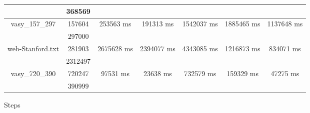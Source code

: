 \documentclass[../master/master.tex]{subfiles}
\begin{document}
\begin{center}
\begin{tabular}{ |c|c||c||c||c||c||c|| }
\cline{2-2}
 & 368569  & & & & & \\
\hline
\multirow{2}{3.8em}{vasy\_157\_297} & 157604 & \multirow{2}{3.8em}{253563 ms} & \multirow{2}{3.8em}{191313 ms} & \multirow{2}{3.8em}{1542037 ms} & \multirow{2}{3.8em}{1885465 ms} & \multirow{2}{3.8em}{1137648 ms} \\
\cline{2-2}
 & 297000  & & & & & \\
\hline
\multirow{2}{3.8em}{web-Stanford.txt} & 281903 & \multirow{2}{3.8em}{2675628 ms} & \multirow{2}{3.8em}{2394077 ms} & \multirow{2}{3.8em}{4343085 ms} & \multirow{2}{3.8em}{1216873 ms} & \multirow{2}{3.8em}{834071 ms} \\
\cline{2-2}
 & 2312497  & & & & & \\
\hline
\multirow{2}{3.8em}{vasy\_720\_390} & 720247 & \multirow{2}{3.8em}{97531 ms} & \multirow{2}{3.8em}{23638 ms} & \multirow{2}{3.8em}{732579 ms} & \multirow{2}{3.8em}{159329 ms} & \multirow{2}{3.8em}{47275 ms} \\
\cline{2-2}
 & 390999  & & & & & \\
\hline
\end{tabular}
\end{center}
Steps
\end{document}
